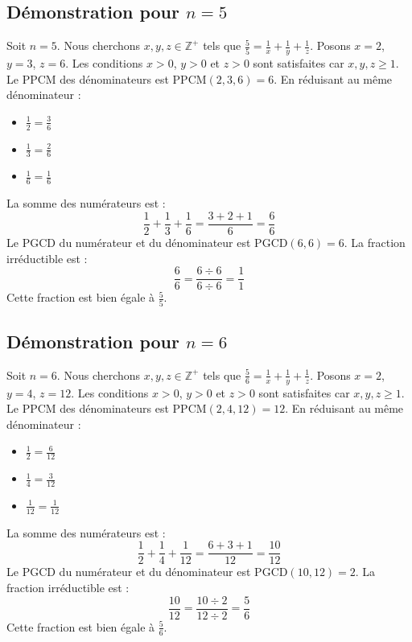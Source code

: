 \documentclass[11pt,a4paper]{article}
\begin{document}
\subsection{Démonstration pour $n = 5$}
Soit $n = 5$. Nous cherchons $x, y, z \in \mathbb{Z}^{+}$ tels que $\frac{5}{5} = \frac{1}{x} + \frac{1}{y} + \frac{1}{z}$.
Posons $x = 2$, $y = 3$, $z = 6$.
Les conditions $x > 0$, $y > 0$ et $z > 0$ sont satisfaites car $x, y, z \geq 1$.
Le PPCM des dénominateurs est $\text{PPCM}(2, 3, 6) = 6$.
En réduisant au même dénominateur :
\begin{itemize}
    \item $\frac{1}{2} = \frac{3}{6}$
    \item $\frac{1}{3} = \frac{2}{6}$
    \item $\frac{1}{6} = \frac{1}{6}$
\end{itemize}
La somme des numérateurs est :
$$ \frac{1}{2} + \frac{1}{3} + \frac{1}{6} = \frac{3 + 2 + 1}{6} = \frac{6}{6} $$
Le PGCD du numérateur et du dénominateur est $\text{PGCD}(6, 6) = 6$.
La fraction irréductible est :
$$ \frac{6}{6} = \frac{6 \div 6}{6 \div 6} = \frac{1}{1} $$
Cette fraction est bien égale à $\frac{5}{5}$.

\subsection{Démonstration pour $n = 6$}
Soit $n = 6$. Nous cherchons $x, y, z \in \mathbb{Z}^{+}$ tels que $\frac{5}{6} = \frac{1}{x} + \frac{1}{y} + \frac{1}{z}$.
Posons $x = 2$, $y = 4$, $z = 12$.
Les conditions $x > 0$, $y > 0$ et $z > 0$ sont satisfaites car $x, y, z \geq 1$.
Le PPCM des dénominateurs est $\text{PPCM}(2, 4, 12) = 12$.
En réduisant au même dénominateur :
\begin{itemize}
    \item $\frac{1}{2} = \frac{6}{12}$
    \item $\frac{1}{4} = \frac{3}{12}$
    \item $\frac{1}{12} = \frac{1}{12}$
\end{itemize}
La somme des numérateurs est :
$$ \frac{1}{2} + \frac{1}{4} + \frac{1}{12} = \frac{6 + 3 + 1}{12} = \frac{10}{12} $$
Le PGCD du numérateur et du dénominateur est $\text{PGCD}(10, 12) = 2$.
La fraction irréductible est :
$$ \frac{10}{12} = \frac{10 \div 2}{12 \div 2} = \frac{5}{6} $$
Cette fraction est bien égale à $\frac{5}{6}$.
\end{document}
